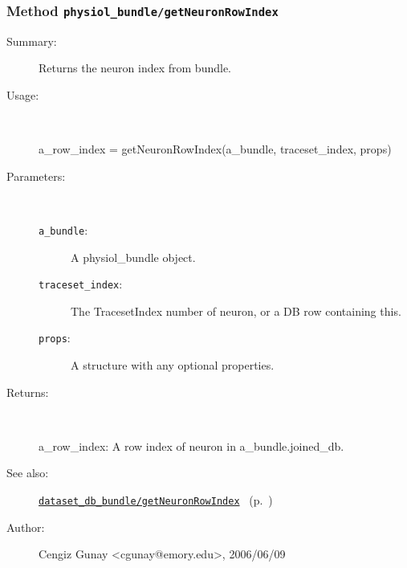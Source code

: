 \subsubsection[Method \texttt{getNeuronRowIndex}]{Method \texttt{physiol\_bundle/getNeuronRowIndex}}%
%
\label{ref_physiol_bundle__getNeuronRowIndex}%
\hypertarget{ref_physiol_bundle__getNeuronRowIndex}{}%
\begin{description}
\item[Summary:]Returns the neuron index from bundle.
%
\item[Usage:]~%
\begin{lyxcode}%
a\_row\_index = getNeuronRowIndex(a\_bundle, traceset\_index, props)
%
\end{lyxcode}%
%
%
\item[Parameters:]~
\begin{description}%
\item[\texttt{a\_bundle}:]
 A physiol\_bundle object.
\item[\texttt{traceset\_index}:]
 The TracesetIndex number of neuron, or a DB row containing this.
\item[\texttt{props}:]
 A structure with any optional properties.
\end{description}%
%
\item[Returns:]~

	a\_row\_index: A row index of neuron in a\_bundle.joined\_db.
%
%
\item[See also:]%
\hyperlink{ref_dataset_db_bundle__getNeuronRowIndex}{\texttt{dataset\_db\_bundle/getNeuronRowIndex}}%
\ (p.~\pageref{ref_dataset_db_bundle__getNeuronRowIndex})%
%
%
\item[Author:]%
Cengiz Gunay <cgunay@emory.edu>, 2006/06/09%
\end{description}
\methodline%
